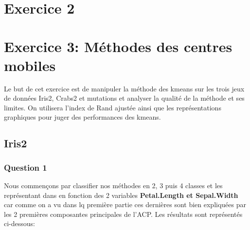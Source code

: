 \documentclass[10pt]{article}
\begin{document}
	\section{ Exercice 2}
	\section{ Exercice 3: Méthodes des centres mobiles}
	Le but de cet exercice est de manipuler la méthode des kmeans sur les trois jeux de données Iris2, Crabs2 et mutations et analyser la qualité de la méthode et ses limites. On utilisera l'index de Rand ajustée ainsi que les représentations graphiques pour juger des performances des kmeans.
	\subsection{Iris2}
	\subsubsection{Question 1}
	Nous commençons par classifier nos méthodes en 2, 3 puis 4 classes et les représentant dans en fonction des 2 variables \textbf{Petal.Length et Sepal.Width} car comme on a vu dans lq première partie ces dernières sont bien expliquées par les 2 premières composantes principales de l'ACP.  Les résultats sont représentés ci-dessous:
	
\end{document}
